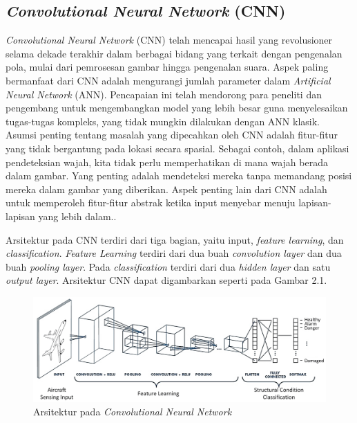 \subsection{\emph{Convolutional Neural Network} (CNN)}
\emph{Convolutional Neural Network} (CNN)  telah mencapai hasil yang revolusioner selama dekade terakhir dalam berbagai bidang yang terkait dengan pengenalan pola, mulai dari pemrosesan gambar hingga pengenalan suara. Aspek paling bermanfaat dari CNN adalah mengurangi jumlah parameter dalam \emph{Artificial Neural Network} (ANN). Pencapaian ini telah mendorong para peneliti dan pengembang untuk mengembangkan model yang lebih besar guna menyelesaikan tugas-tugas kompleks, yang tidak mungkin dilakukan dengan ANN klasik. Asumsi penting tentang masalah yang dipecahkan oleh CNN adalah fitur-fitur yang tidak bergantung pada lokasi secara spasial. Sebagai contoh, dalam aplikasi pendeteksian wajah, kita tidak perlu memperhatikan di mana wajah berada dalam gambar. Yang penting adalah mendeteksi mereka tanpa memandang posisi mereka dalam gambar yang diberikan. Aspek penting lain dari CNN adalah untuk memperoleh fitur-fitur abstrak ketika input menyebar menuju lapisan-lapisan yang lebih dalam.\parencite{albawi}.

Arsitektur pada CNN terdiri dari tiga bagian, yaitu input, \emph{feature learning}, dan \emph{classification}. \emph{Feature Learning} terdiri dari dua buah \emph{convolution layer} dan dua buah \emph{pooling layer}. Pada \emph{classification} terdiri dari dua \emph{hidden layer} dan satu \emph{output layer}. Arsitektur CNN dapat digambarkan seperti pada Gambar 2.1.

\begin{figure} [ht] \centering
    \includegraphics[scale=0.12]{gambar/arsitekturcnn.png}
    \caption{Arsitektur pada \emph{Convolutional Neural Network}}
    \label{fig:arsitektur cnn}
\end{figure}

